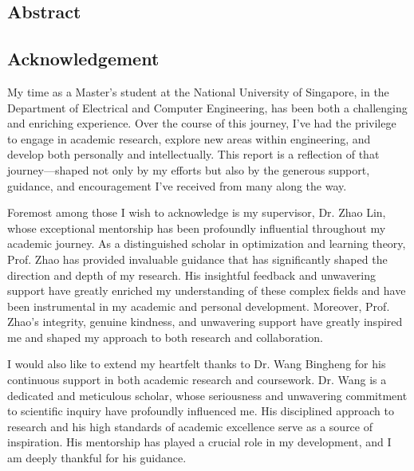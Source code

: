 \documentclass[12pt,twoside,letterpaper]{article}
\begin{document}


\begin{center}
    \section*{Abstract}
\end{center}

\newpage

\begin{center}
    \section*{Acknowledgement}
\end{center}
My time as a Master’s student at the National University of Singapore, in the Department of Electrical and Computer Engineering, has been both a challenging and enriching experience. Over the course of this journey, I’ve had the privilege to engage in academic research, explore new areas within engineering, and develop both personally and intellectually. This report is a reflection of that journey—shaped not only by my efforts but also by the generous support, guidance, and encouragement I’ve received from many along the way.

Foremost among those I wish to acknowledge is my supervisor, Dr. Zhao Lin, whose exceptional mentorship has been profoundly influential throughout my academic journey. As a distinguished scholar in optimization and learning theory, Prof. Zhao has provided invaluable guidance that has significantly shaped the direction and depth of my research. His insightful feedback and unwavering support have greatly enriched my understanding of these complex fields and have been instrumental in my academic and personal development.  Moreover, Prof. Zhao's integrity, genuine kindness, and unwavering support have greatly inspired me and shaped my approach to both research and collaboration.

I would also like to extend my heartfelt thanks to Dr. Wang Bingheng for his continuous support in both academic research and coursework. Dr. Wang is a dedicated and meticulous scholar, whose seriousness and unwavering commitment to scientific inquiry have profoundly influenced me. His disciplined approach to research and his high standards of academic excellence serve as a source of inspiration. His mentorship has played a crucial role in my development, and I am deeply thankful for his guidance.
\end{document}
